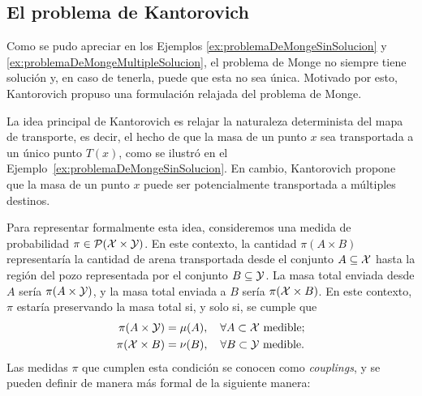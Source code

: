 
\subsection{El problema de Kantorovich}  %

Como se pudo apreciar en los Ejemplos \ref*{ex:problemaDeMongeSinSolucion} y \ref*{ex:problemaDeMongeMultipleSolucion}, el problema de Monge no siempre tiene solución y, en caso de tenerla, puede que esta no sea única. Motivado por esto, Kantorovich \cite{kantorovich1942translocation} propuso una formulación relajada del problema de Monge.

La idea principal de Kantorovich es relajar la naturaleza determinista del mapa de transporte, es decir, el hecho de que la masa de un punto $x$ sea transportada a un único punto $T(x)$, como se ilustró en el Ejemplo~\ref{ex:problemaDeMongeSinSolucion}. En cambio, Kantorovich propone que la masa de un punto $x$ puede ser potencialmente transportada a múltiples destinos.

Para representar formalmente esta idea, consideremos una medida de probabilidad $\pi \in \ProbSpace[\cX \times \cY]$. En este contexto, la cantidad $\pi(A \times B)$ representaría la cantidad de arena transportada desde el conjunto $A \subseteq \cX$ hasta la región del pozo representada por el conjunto $B \subseteq \cY$. La masa total enviada desde $A$ sería $\pi(A \times \cY)$, y la masa total enviada a $B$ sería $\pi(\cX \times B)$. En este contexto, $\pi$ estaría preservando la masa total si, y solo si, se cumple que
\begin{align*}
    \pi(A \times \cY) & = \mu(A), \quad \forall A \subset \cX \text{ medible;} \\
    \pi(\cX \times B) & = \nu(B),\quad \forall B \subset \cY \text{ medible.}
\end{align*}
Las medidas $\pi$ que cumplen esta condición se conocen como \emph{couplings}, y se pueden definir de manera más formal de la siguiente manera:

